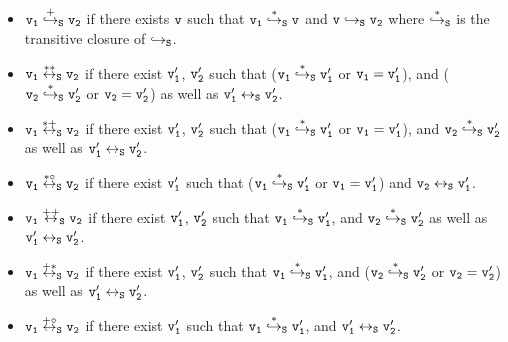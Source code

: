 \begin{itemize}
\item  $\tt v_1 \overset{+}\hookrightarrow_S v_2$ if there exists $\tt v$ such that $\tt v_1 \overset{*}\hookrightarrow_S v$ and $\tt v \hookrightarrow_S v_2$  where  $\tt \overset{*}\hookrightarrow_S$ is the transitive closure of $\tt \hookrightarrow_S$. 
\item $\tt v_1  \overset{**}\leftrightarrow_S  v_2$ if there exist $\tt v_1'$, $\tt v_2'$ such that ($\tt v_1  \overset{*}\hookrightarrow_S v_1'$ or $\tt v_1 = v_1'$), and ($\tt v_2  \overset{*}\hookrightarrow_S v_2'$ or $\tt v_2 = v_2'$) as well as $\tt v_1' \leftrightarrow_S v_2'$. 
\item $\tt v_1  \overset{*+}\leftrightarrow_S v_2$ if there exist $\tt v_1'$, $\tt v_2'$ such that ($\tt v_1  \overset{*}\hookrightarrow_S v_1'$ or $\tt v_1 = v_1'$), and $\tt v_2  \overset{*}\hookrightarrow_S v_2'$ as well as $\tt v_1' \leftrightarrow_S v_2'$. 
\item $\tt v_1  \overset{*\circ}\leftrightarrow_S v_2$ if there exist $\tt v_1'$ such that ($\tt v_1  \overset{*}\hookrightarrow_S v_1'$ or  $\tt v_1 = v_1'$) and  $\tt v_2 \leftrightarrow_S v_1'$.
\item $\tt v_1 \overset{++}\leftrightarrow_S v_2$ if there exist $\tt v_1'$, $\tt v_2'$ such that $\tt v_1  \overset{*}\hookrightarrow_S v_1'$, and $\tt v_2  \overset{*}\hookrightarrow_S v_2'$ as well as $\tt v_1' \leftrightarrow_S v_2'$.

\item $\tt v_1 \overset{+*}\leftrightarrow_S v_2$ if there exist $\tt v_1'$, $\tt v_2'$ such that $\tt v_1  \overset{*}\hookrightarrow_S v_1'$, and ($\tt v_2  \overset{*}\hookrightarrow_S v_2'$ or $\tt v_2 = v_2'$) as well as $\tt v_1' \leftrightarrow_S v_2'$.

\item $\tt v_1 \overset{+\circ}\leftrightarrow_S v_2$ if there exist $\tt v_1'$ such that $\tt v_1  \overset{*}\hookrightarrow_S v_1'$, and $\tt v_1' \leftrightarrow_S v_2'$.
\end{itemize}
 
